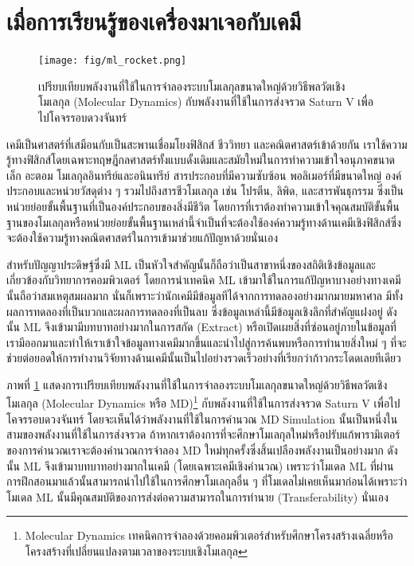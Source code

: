 \section{เมื่อการเรียนรู้ของเครื่องมาเจอกับเคมี}
\label{sec:ml_meets_chem}

\begin{figure}[H]
    \centering
    \texttt{[image: fig/ml\_rocket.png]}
    \caption{เปรียบเทียบพลังงานที่ใช้ในการจำลองระบบโมเลกุลขนาดใหญ่ด้วยวิธีพลวัตเชิงโมเลกุล (Molecular Dynamics) กับพลังงานที่ใช้ในการส่งจรวด Saturn V เพื่อไปโคจรรอบดวงจันทร์}
    \label{fig:ml_rocket}
\end{figure}

เคมีเป็นศาสตร์ที่เสมือนกับเป็นสะพานเชื่อมโยงฟิสิกส์ ชีววิทยา และคณิตศาสตร์เข้าด้วยกัน เราใช้ความรู้ทางฟิสิกส์โดยเฉพาะทฤษฎีกลศาสตร์ทั้งแบบดั้งเดิมและสมัยใหม่ในการทำความเข้าใจอนุภาคขนาดเล็ก อะตอม โมเลกุลอินทรีย์และอนินทรีย์ สารประกอบที่มีความซับซ้อน พอลิเมอร์ที่มีขนาดใหญ่ องค์ประกอบและหน่วยวัสดุต่าง ๆ รวมไปถึงสารชีวโมเลกุล เช่น โปรตีน, ลิพิด, และสารพันธุกรรม ซึ่งเป็นหน่วยย่อยขั้นพื้นฐานที่เป็นองค์ประกอบของสิ่งมีชีวิต โดยการที่เราต้องทำความเข้าใจคุณสมบัติขั้นพื้นฐานของโมเลกุลหรือหน่วยย่อยขั้นพื้นฐานเหล่านี้จำเป็นที่จะต้องใช้องค์ความรู้ทางด้านเคมีเชิงฟิสิกส์ซึ่งจะต้องใช้ความรู้ทางคณิตศาสตร์ในการเข้ามาช่วยแก้ปัญหาด้วยนั่นเอง

สำหรับปัญญาประดิษฐ์ซึ่งมี ML เป็นหัวใจสำคัญนั้นก็ถือว่าเป็นสาขาหนึ่งของสถิติเชิงข้อมูลและเกี่ยวข้องกับวิทยาการคอมพิวเตอร์ โดยการนำเทคนิค ML เข้ามาใช้ในการแก้ปัญหาบางอย่างทางเคมีนั้นถือว่าสมเหตุสมผลมาก นั่นก็เพราะว่านักเคมีมีข้อมูลทีได้จากการทดลองอย่างมากมายมหาศาล มีทั้งผลการทดลองที่เป็นบวกและผลการทดลองที่เป็นลบ ซึ่งข้อมูลเหล่านี้มีข้อมูลเชิงลึกที่สำคัญแฝงอยู่ ดังนั้น ML จึงเข้ามามีบทบาทอย่างมากในการสกัด (Extract) หรือเปิดเผยสิ่งที่ซ่อนอยู่ภายในข้อมูลที่เรามีออกมาและทำให้เราเข้าใจข้อมูลทางเคมีมากขึ้นและนำไปสู่การค้นพบหรือการทำนายสิ่งใหม่ ๆ ที่จะช่วยต่อยอดให้การทำงานวิจัยทางด้านเคมีนั้นเป็นไปอย่างรวดเร็วอย่างที่เรียกว่าก้าวกระโดดเลยทีเดียว\autocite{cartwright2020,zotero-817}

ภาพที่ \ref{fig:ml_rocket} แสดงการเปรียบเทียบพลังงานที่ใช้ในการจำลองระบบโมเลกุลขนาดใหญ่ด้วยวิธีพลวัตเชิงโมเลกุล (Molecular Dynamics หรือ MD)\footnote{Molecular Dynamics เทคนิคการจำลองด้วยคอมพิวเตอร์สำหรับศึกษาโครงสร้างเฉลี่ยหรือโครงสร้างที่เปลี่ยนแปลงตามเวลาของระบบเชิงโมเลกุล} กับพลังงานที่ใช้ในการส่งจรวด Saturn V เพื่อไปโคจรรอบดวงจันทร์ โดยจะเห็นได้ว่าพลังงานที่ใช้ในการคำนวณ MD Simulation นั้นเป็นหนึ่งในสามของพลังงานที่ใช้ในการส่งจรวด ถ้าหากเราต้องการที่จะศึกษาโมเลกุลใหม่หรือปรับแก้พารามิเตอร์ของการคำนวณเราจะต้องคำนวณการจำลอง MD ใหม่ทุกครั้งซึ่งสิ้นเปลืองพลังงานเป็นอย่างมาก ดังนั้น ML จึงเข้ามาบทบาทอย่างมากในเคมี (โดยเฉพาะเคมีเชิงคำนวณ) เพราะว่าโมเดล ML ที่ผ่านการฝึกสอนมาแล้วนั้นสามารถนำไปใช้ในการศึกษาโมเลกุลอื่น ๆ ที่โมเดลไม่เคยเห็นมาก่อนได้เพราะว่าโมเดล ML นั้นมีคุณสมบัติของการส่งต่อความสามารถในการทำนาย (Transferability) นั่นเอง


